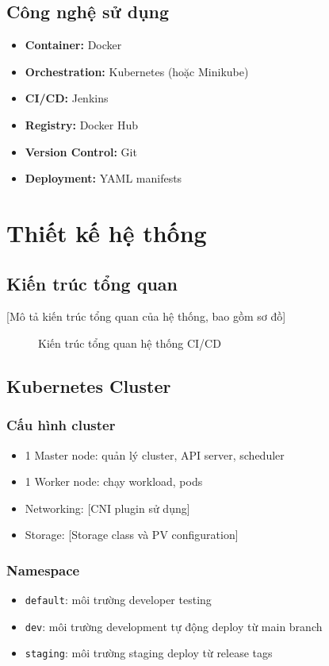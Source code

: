 \documentclass[12pt,a4paper]{article}
\begin{document}
\subsection{Công nghệ sử dụng}
\begin{itemize}
    \item \textbf{Container:} Docker
    \item \textbf{Orchestration:} Kubernetes (hoặc Minikube)
    \item \textbf{CI/CD:} Jenkins
    \item \textbf{Registry:} Docker Hub
    \item \textbf{Version Control:} Git
    \item \textbf{Deployment:} YAML manifests
\end{itemize}

\section{Thiết kế hệ thống}

\subsection{Kiến trúc tổng quan}
[Mô tả kiến trúc tổng quan của hệ thống, bao gồm sơ đồ]

\begin{figure}[h]
    \centering
    \caption{Kiến trúc tổng quan hệ thống CI/CD}
    \label{fig:architecture}
\end{figure}

\subsection{Kubernetes Cluster}
\subsubsection{Cấu hình cluster}
\begin{itemize}
    \item 1 Master node: quản lý cluster, API server, scheduler
    \item 1 Worker node: chạy workload, pods
    \item Networking: [CNI plugin sử dụng]
    \item Storage: [Storage class và PV configuration]
\end{itemize}

\subsubsection{Namespace}
\begin{itemize}
    \item \texttt{default}: môi trường developer testing
    \item \texttt{dev}: môi trường development tự động deploy từ main branch
    \item \texttt{staging}: môi trường staging deploy từ release tags
\end{itemize}
\end{document}
